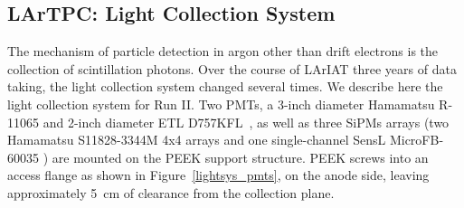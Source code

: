 \subsection{LArTPC: Light Collection System}\label{sec:TPCLight}
The mechanism of particle detection in argon other than drift electrons is the collection of scintillation photons.  Over the course of LArIAT three years of data taking, the light collection system changed several times. We describe here the light collection system for Run II. Two PMTs, a 3-inch diameter Hamamatsu R-11065 and 2-inch diameter ETL D757KFL~\cite{lightsys-pmttests}, as well as three SiPMs arrays (two Hamamatsu S11828-3344M 4x4 arrays and one single-channel SensL MicroFB-60035 ) are mounted on the PEEK support structure. PEEK screws into an access flange as shown in Figure~\ref{lightsys_pmts}, on the anode side, leaving  approximately 5~cm of clearance from the collection plane.  

